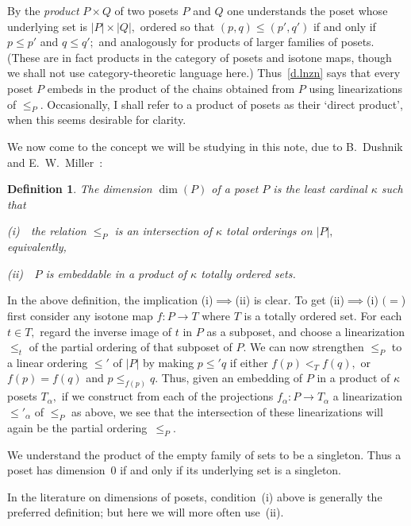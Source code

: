 \documentclass{amsart}
\newtheorem{definition}[theorem]{Definition}
\numberwithin{equation}{section}
\numberwithin{theorem}{section}
\newcommand{\2}{\mathbf{2}}
\begin{document}
By the {\em product} $P\times Q$ of two posets $P$ and $Q$ one
understands the poset whose underlying set is
$|P|\times|Q|,$ ordered so that $(p,q)\leq (p',q')$
if and only if $p\leq p'$ and $q\leq q';$
and analogously for products of larger families of posets.
(These are in fact products in the category of posets and isotone
maps, though we shall not use category-theoretic language here.)
Thus~\eqref{d.lnzn} says
that every poset $P$ embeds in the product of the chains
obtained from $P$ using linearizations of $\leq_P.$
Occasionally, I shall refer to a product of posets as their
`direct product', when this seems desirable for clarity.

We now come to the concept we will be studying in this note,
due to B.\ Dushnik and E.\ W.\ Miller~\cite{D+M}:

\begin{definition}\label{D.dim}
The {\em dimension} $\dim(P)$ of a poset $P$ is the least cardinal
$\kappa$ such that

\textup{(i)}\ \ the relation $\leq_P$ is an
intersection of $\kappa$ total orderings on $|P|,$\\
%
equivalently,

\textup{(ii)}\ \ $P$ is embeddable in a product of $\kappa$ totally
ordered sets.
\end{definition}

In the above  definition, the implication (i)$\implies$(ii) is clear.
To get (ii)$\implies$(i) $(=$\cite[Theorem~10.4.2]{Ore})
first consider any isotone map
$f:P\to T$ where $T$ is a totally ordered set.
For each $t\in T,$ regard the inverse image of $t$ in $P$
as a subposet, and choose a linearization $\leq_t$ of
the partial ordering of that subposet of $P.$
We can now strengthen $\leq_P$ to a linear ordering $\leq'$
of $|P|$ by making $p\leq' q$ if either
$f(p) <_T f(q),$ or $f(p) = f(q)$ and $p\leq_{f(p)} q.$
Thus, given an embedding of $P$ in a product of $\kappa$
posets $T_\alpha,$ if we construct
from each of the projections $f_\alpha: P\to T_\alpha$ a linearization
$\leq'_\alpha$ of $\leq_P$ as above, we see that the intersection of
these linearizations will again be the partial ordering~$\leq_P.$

We understand the product of the empty family of sets to
be a singleton.
Thus a poset has dimension~$0$ if
and only if its underlying set is a singleton.

In the literature on dimensions of posets, condition~(i)
above is generally
the preferred definition; but here we will more often use~(ii).
\end{document}

